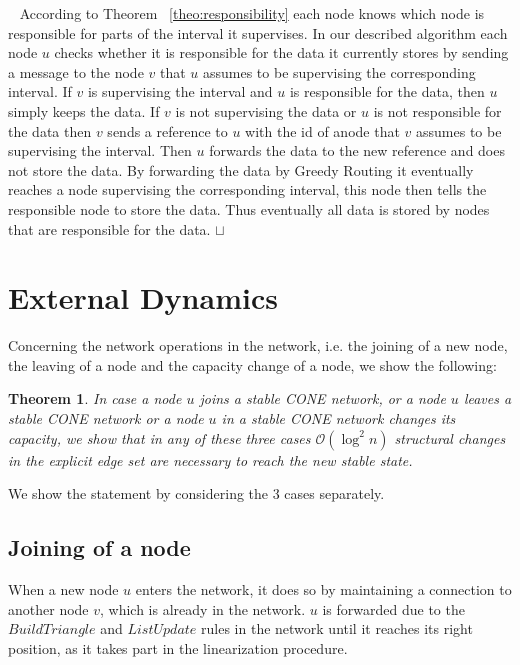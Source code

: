 \documentclass[11pt]{article}
\newtheorem{theorem}{Theorem}[section]
\newcommand{\sq}{\hbox{\rlap{$\sqcap$}$\sqcup$}}
\newcommand{\qed}{\hspace*{\fill}\sq}
\newenvironment{proof}{\noindent {\bf Proof.}\ }{\qed\par\vskip 4mm\par}
\begin{document}
\begin{proof}
According to Theorem ~\ref{theo:responsibility} each node knows which node is responsible for parts of the interval it supervises. In our described algorithm each node $u$ checks whether it is responsible for the data it currently stores by sending a message to the node $v$ that $u$ assumes to be supervising the corresponding interval. If $v$ is supervising the interval and $u$ is responsible for the data, then $u$ simply keeps the data. If $v$ is not supervising the data or $u$ is not responsible for the data then $v$ sends a reference to $u$ with the id of anode that $v$ assumes to be supervising the interval. Then $u$ forwards the data to the new reference and does not store the data. By forwarding the data by Greedy Routing it eventually reaches a node supervising the corresponding interval, this node then tells the responsible node to store the data. Thus eventually all data is stored by nodes that are responsible for the data.
\end{proof}



\section{External Dynamics}\label{ops}

Concerning the network operations in the network, i.e. the joining of a new node, the leaving of a node and the capacity change of a node, we show the following:

\begin{theorem}\label{theo:dynam}
In case a node $u$ joins a stable CONE network, or a node $u$ leaves a stable CONE network 
or a node $u$ in a stable CONE network changes its capacity, we show that in any of these three cases $\mathcal O(\log^2 n)$ structural changes in the explicit edge set are necessary to reach the new stable state.
\end{theorem}

We show the statement by considering the 3 cases separately.

\subsection{Joining of a node}

When a new node $u$ enters the network, it does so by maintaining a connection to another node $v$, which is already in the network. $u$ is forwarded due to the $BuildTriangle$ and $ListUpdate$ rules in the network until it reaches its right position, as it takes part in the linearization procedure.
\end{document}
